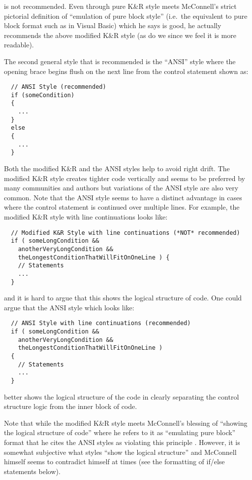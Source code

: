 \begin{itemize}
is not recommended.  Even through pure K\&R style meets McConnell's strict
pictorial definition of ``emulation of pure block style'' (i.e.\ the
equivalent to pure block format such as in Visual Basic) which he says is
good, he actually recommends the above modified K\&R style (as do we since we
feel it is more readable).

The second general style that is recommended is the ``ANSI''
style{}\cite{ArtisticStyle} where the opening brace begins flush on the next
line from the control statement shown as:

{\small\begin{verbatim}
  // ANSI Style (recommended)
  if (someCondition)
  {
    ...
  }
  else
  {
    ...
  }
\end{verbatim}}

Both the modified K\&R and the ANSI styles help to avoid right drift.  The
modified K\&R style creates tighter code vertically and seems to be preferred
by many communities and authors but variations of the ANSI style are also very
common.  Note that the ANSI style seems to have a distinct advantage in cases
where the control statement is continued over multiple lines.  For example,
the modified K\&R style with line continuations looks like:

{\small\begin{verbatim}
  // Modified K&R Style with line continuations (*NOT* recommended)
  if ( someLongCondition &&
    anotherVeryLongCondition &&
    theLongestConditionThatWillFitOnOneLine ) {
    // Statements
    ...
  }
\end{verbatim}}

{}\noindent{}and it is hard to argue that this shows the logical structure of
code.  One could argue that the ANSI style which looks like:

{\small\begin{verbatim}
  // ANSI Style with line continuations (recommended)
  if ( someLongCondition &&
    anotherVeryLongCondition &&
    theLongestConditionThatWillFitOnOneLine )
  {
    // Statements
    ...
  }
\end{verbatim}}

better shows the logical structure of the code in clearly separating the
control structure logic from the inner block of code.

Note that while the modified K\&R style meets McConnell's blessing of
``showing the logical structure of code'' where he refers to it as ``emulating
pure block'' format that he cites the ANSI styles as violating this principle
{}\cite[Section 31.1]{CodeComplete2nd04}.  However, it is somewhat subjective
what styles ``show the logical structure'' and McConnell himself seems to
contradict himself at times (see the formatting of if/else statements below).


\end{itemize}
